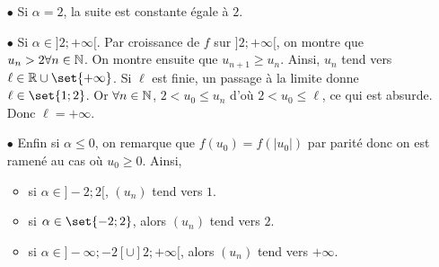 \documentclass{magnolia}
\begin{document}
\begin{exos}
\begin{sol}
\begin{itemize}
\item[$\bullet$] Si $\alpha=2$, la suite est constante égale à $2$.

\item[$\bullet$] Si $\alpha \in ]2;+\infty[$. Par croissance de $f$ sur $]2;+\infty[$, on montre que $u_n>2 \forall n \in \mathbb{N}$. On montre ensuite que $u_{n+1}\geq u_n$. Ainsi, $u_n$ tend vers $\ell \in \R\cup\set{+\infty}$. Si $\ell$ est finie, un passage à la limite donne $\ell \in \set{1;2}$. Or $\forall n \in \mathbb{N}$, $2<u_0\leq u_n$ d'où $2<u_0\leq \ell$, ce qui est absurde. Donc $\ell=+\infty$.

\item[$\bullet$] Enfin si $\alpha \leq 0$, on remarque que $f(u_0)=f(|u_0|)$ par parité donc on est ramené au cas où $u_0\geq 0$. Ainsi,
\begin{itemize}
\item si $\alpha \in ]-2;2[$, $(u_n)$ tend vers $1$.
\item si $\alpha \in \set{-2;2}$, alors $(u_n)$ tend vers $2$.
\item si $\alpha \in ]-\infty;-2[\cup ]2;+\infty[$, alors $(u_n)$ tend vers $+\infty$.
\end{itemize}
\end{itemize}
\end{sol}
\end{exos}
\end{document}
